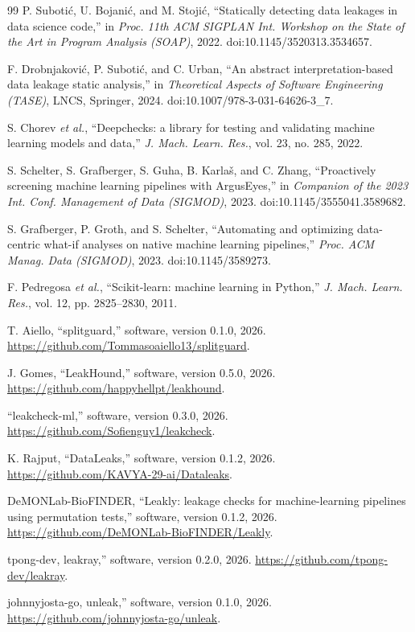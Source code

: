 \documentclass[10pt,a4paper,twocolumn]{article}
\begin{document}
\begin{thebibliography}{99}
 P. Suboti\'{c}, U. Bojani\'{c}, and M. Stoji\'{c}, ``Statically detecting data leakages in
data science code,'' in \emph{Proc. 11th ACM SIGPLAN Int. Workshop on the State of the Art in Program Analysis
(SOAP)}, 2022. doi:10.1145/3520313.3534657.

 F. Drobnjakovi\'{c}, P. Suboti\'{c}, and C. Urban, ``An abstract interpretation-based
data leakage static analysis,'' in \emph{Theoretical Aspects of Software Engineering (TASE)}, LNCS, Springer,
2024. doi:10.1007/978-3-031-64626-3\_7.

 S. Chorev \emph{et al.}, ``Deepchecks: a library for testing and validating machine learning
models and data,'' \emph{J. Mach. Learn. Res.}, vol. 23, no. 285, 2022.

 S. Schelter, S. Grafberger, S. Guha, B. Karla\v{s}, and C. Zhang, ``Proactively screening
machine learning pipelines with ArgusEyes,'' in \emph{Companion of the 2023 Int. Conf. Management of Data
(SIGMOD)}, 2023. doi:10.1145/3555041.3589682.

 S. Grafberger, P. Groth, and S. Schelter, ``Automating and optimizing data-centric
what-if analyses on native machine learning pipelines,'' \emph{Proc. ACM Manag. Data (SIGMOD)}, 2023.
doi:10.1145/3589273.

 F. Pedregosa \emph{et al.}, ``Scikit-learn: machine learning in Python,'' \emph{J. Mach.
Learn. Res.}, vol. 12, pp. 2825--2830, 2011.

 T. Aiello, ``splitguard,'' software, version 0.1.0, 2026.
\url{https://github.com/Tommasoaiello13/splitguard}.

 J. Gomes, ``LeakHound,'' software, version 0.5.0, 2026.
\url{https://github.com/happyhellpt/leakhound}.

 ``leakcheck-ml,'' software, version 0.3.0, 2026.
\url{https://github.com/Sofienguy1/leakcheck}.

 K. Rajput, ``DataLeaks,'' software, version 0.1.2, 2026.
\url{https://github.com/KAVYA-29-ai/Dataleaks}.

 DeMONLab-BioFINDER, ``Leakly: leakage checks for machine-learning pipelines using permutation tests,''
software, version 0.1.2, 2026. \url{https://github.com/DeMONLab-BioFINDER/Leakly}.

 tpong-dev, leakray,'' software, version 0.2.0, 2026. \url{https://github.com/tpong-dev/leakray}.

 johnnyjosta-go, unleak,'' software, version 0.1.0, 2026. \url{https://github.com/johnnyjosta-go/unleak}.

\end{thebibliography}
\end{document}
